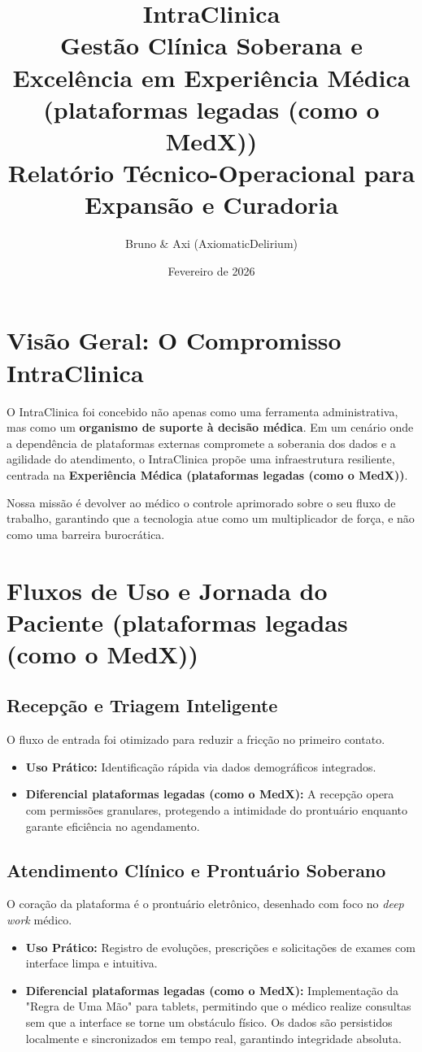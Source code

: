 \documentclass[12pt,a4paper]{article}
\title{
    \vspace{2cm}
    \textbf{\Huge IntraClinica}\\
    \large Gestão Clínica Soberana e Excelência em Experiência Médica (plataformas legadas (como o MedX))\\
    \vspace{1cm}
    \Large Relatório Técnico-Operacional para Expansão e Curadoria
}
\author{Bruno \& Axi (AxiomaticDelirium)}
\date{Fevereiro de 2026}
\begin{document}
\maketitle
\newpage

\tableofcontents
\newpage

\section{Visão Geral: O Compromisso IntraClinica}
O IntraClinica foi concebido não apenas como uma ferramenta administrativa, mas como um \textbf{organismo de suporte à decisão médica}. Em um cenário onde a dependência de plataformas externas compromete a soberania dos dados e a agilidade do atendimento, o IntraClinica propõe uma infraestrutura resiliente, centrada na \textbf{Experiência Médica (plataformas legadas (como o MedX))}.

Nossa missão é devolver ao médico o controle aprimorado sobre o seu fluxo de trabalho, garantindo que a tecnologia atue como um multiplicador de força, e não como uma barreira burocrática.

\section{Fluxos de Uso e Jornada do Paciente (plataformas legadas (como o MedX))}

\subsection{Recepção e Triagem Inteligente}
O fluxo de entrada foi otimizado para reduzir a fricção no primeiro contato.
\begin{itemize}
    \item \textbf{Uso Prático:} Identificação rápida via dados demográficos integrados.
    \item \textbf{Diferencial plataformas legadas (como o MedX):} A recepção opera com permissões granulares, protegendo a intimidade do prontuário enquanto garante eficiência no agendamento.
\end{itemize}

\subsection{Atendimento Clínico e Prontuário Soberano}
O coração da plataforma é o prontuário eletrônico, desenhado com foco no \textit{deep work} médico.
\begin{itemize}
    \item \textbf{Uso Prático:} Registro de evoluções, prescrições e solicitações de exames com interface limpa e intuitiva.
    \item \textbf{Diferencial plataformas legadas (como o MedX):} Implementação da "Regra de Uma Mão" para tablets, permitindo que o médico realize consultas sem que a interface se torne um obstáculo físico. Os dados são persistidos localmente e sincronizados em tempo real, garantindo integridade absoluta.
\end{itemize}
\end{document}
